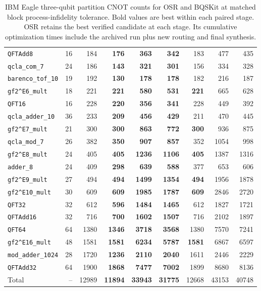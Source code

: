\begin{table}[p]
\begin{tabular}{lrr|rrr|rrr}
\texttt{QFTAdd8} & 16 & 184 & \textbf{176} & \textbf{363} & \textbf{342} & 183 & 477 & 435 \\
\texttt{qcla\_com\_7} & 24 & 186 & \textbf{143} & \textbf{321} & \textbf{301} & 156 & 334 & 328 \\
\texttt{barenco\_tof\_10} & 19 & 192 & \textbf{130} & \textbf{178} & \textbf{178} & 182 & 216 & 187 \\
\texttt{gf2\textasciicircum{}E6\_mult} & 18 & 221 & \textbf{221} & \textbf{580} & \textbf{531} & \textbf{221} & 665 & 628 \\
\texttt{QFT16} & 16 & 228 & \textbf{220} & \textbf{356} & \textbf{341} & 228 & 449 & 392 \\
\texttt{qcla\_adder\_10} & 36 & 233 & \textbf{209} & \textbf{456} & \textbf{429} & 211 & 470 & 445 \\
\texttt{gf2\textasciicircum{}E7\_mult} & 21 & 300 & \textbf{300} & \textbf{863} & \textbf{772} & \textbf{300} & 936 & 875 \\
\texttt{qcla\_mod\_7} & 26 & 382 & \textbf{350} & \textbf{907} & \textbf{857} & 352 & 1054 & 998 \\
\texttt{gf2\textasciicircum{}E8\_mult} & 24 & 405 & \textbf{405} & \textbf{1236} & \textbf{1106} & \textbf{405} & 1387 & 1316 \\
\texttt{adder\_8} & 24 & 409 & \textbf{298} & \textbf{639} & \textbf{588} & 377 & 653 & 606 \\
\texttt{gf2\textasciicircum{}E9\_mult} & 27 & 494 & \textbf{494} & \textbf{1499} & \textbf{1354} & \textbf{494} & 1956 & 1878 \\
\texttt{gf2\textasciicircum{}E10\_mult} & 30 & 609 & \textbf{609} & \textbf{1985} & \textbf{1787} & \textbf{609} & 2846 & 2720 \\
\texttt{QFT32} & 32 & 612 & \textbf{596} & \textbf{1484} & \textbf{1465} & 612 & 1827 & 1721 \\
\texttt{QFTAdd16} & 32 & 716 & \textbf{700} & \textbf{1602} & \textbf{1507} & 716 & 2102 & 1897 \\
\texttt{QFT64} & 64 & 1380 & \textbf{1346} & \textbf{3718} & \textbf{3568} & 1380 & 7570 & 7241 \\
\texttt{gf2\textasciicircum{}E16\_mult} & 48 & 1581 & \textbf{1581} & \textbf{6234} & \textbf{5787} & \textbf{1581} & 6867 & 6597 \\
\texttt{mod\_adder\_1024} & 28 & 1720 & \textbf{1236} & \textbf{2110} & \textbf{2040} & 1611 & 2446 & 2229 \\
\texttt{QFTAdd32} & 64 & 1900 & \textbf{1868} & \textbf{7477} & \textbf{7002} & 1899 & 8680 & 8136 \\
\hline
Total & -- & 12989 & \textbf{11894} & \textbf{33943} & \textbf{31775} & 12668 & 43153 & 40748 \\
\hline
\end{tabular}
\caption{IBM Eagle three-qubit partition CNOT counts for OSR and BQSKit at matched block process-infidelity tolerance. Bold values are best within each paired stage. OSR retains the best verified candidate at each stage. Its cumulative optimization times include the archived run plus new routing and final synthesis.}
\label{tab:osr-bqskit-three-qubit-ibm-eagle-counts}
\end{table}
